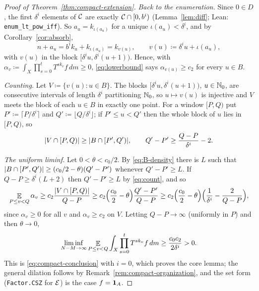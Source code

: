 \begin{proof}[Proof of Theorem~\ref{thm:compact-extension}]
  \emph{Back to the enumeration.}  Since $0 \in D$, the first $\delta^i$ elements of $\mathcal{C}$
  are exactly $\mathcal{C} \cap [0,b^i)$ (Lemma~\ref{lem:diff}; Lean: \texttt{enum\_lt\_pow\_iff}).
  So $a_u = k_{\iota(a_u)}$ for a unique $\iota(a_u) < \delta^i$, and by
  Corollary~\ref{cor:absorb},
  \[
    n + a_u = b^i k_u + k_{\iota(a_u)} = k_{v(u)} , \qquad v(u) \coloneqq \delta^i u + \iota(a_u) ,
  \]
  with $v(u)$ in the block $[\delta^i u, \delta^i(u+1))$.  Hence, with
  $\alpha_v \coloneqq \int_X \prod_{s=0}^{t} T^{s k_v}f\,dm \geq 0$, \eqref{eq:lowerbound} says
  $\alpha_{v(u)} \geq c_2$ for every $u \in B$.

  \emph{Counting.}  Let $V \coloneqq \{v(u) : u \in B\}$.  The blocks
  $[\delta^iu, \delta^i(u+1))$, $u \in \mathbb{N}_0$, are consecutive intervals of length $\delta^i$
  partitioning $\mathbb{N}_0$, so $u \mapsto v(u)$ is injective and $V$ meets the block of each
  $u \in B$ in exactly one point.  For a window $[P,Q)$ put
  $P' \coloneqq \lceil P/\delta^i\rceil$ and $Q' \coloneqq \lfloor Q/\delta^i\rfloor$; if
  $P' \leq u < Q'$ then the whole block of $u$ lies in $[P,Q)$, so
  \begin{equation}
    \label{eq:count}
    \lvert V \cap [P,Q) \rvert \geq \lvert B \cap [P',Q') \rvert ,
    \qquad Q' - P' \geq \frac{Q-P}{\delta^i} - 2 .
  \end{equation}

  \emph{The uniform liminf.}  Let $0 < \theta < c_0/2$.  By \eqref{eq:B-density} there is
  $L$ such that $\lvert B \cap [P',Q') \rvert \geq (c_0/2 - \theta)(Q'-P')$ whenever $Q' - P' \geq L$.
  If $Q - P \geq \delta^i(L + 2)$ then $Q' - P' \geq L$ by \eqref{eq:count}, and so
  \[
    \mathop{\mathbb{E}}_{P \leq v < Q} \alpha_v \geq c_2 \frac{\lvert V \cap [P,Q) \rvert}{Q-P}
      \geq c_2 \Bigl(\frac{c_0}{2} - \theta\Bigr) \frac{Q'-P'}{Q-P}
      \geq c_2 \Bigl(\frac{c_0}{2} - \theta\Bigr) \Bigl( \frac{1}{\delta^i} - \frac{2}{Q-P} \Bigr) ,
  \]
  since $\alpha_v \geq 0$ for all $v$ and $\alpha_v \geq c_2$ on $V$.  Letting $Q - P \to \infty$
  (uniformly in $P$) and then $\theta \to 0$,
  \[
    \liminf_{N-M \to \infty} \mathop{\mathbb{E}}_{P \leq v < Q} \int_X \prod_{s=0}^{t} T^{s k_v} f \, dm
      \geq \frac{c_0 c_2}{2\delta^i} > 0 .
  \]
  This is \eqref{eq:compact-conclusion} with $i = 0$, which proves the core lemma; the
  general dilation follows by Remark~\ref{rem:compact-organization}, and the set form
  (\texttt{Factor.CSZ} for $\mathcal{E}$) is the case $f = \mathbf{1}_A$.
\end{proof}

